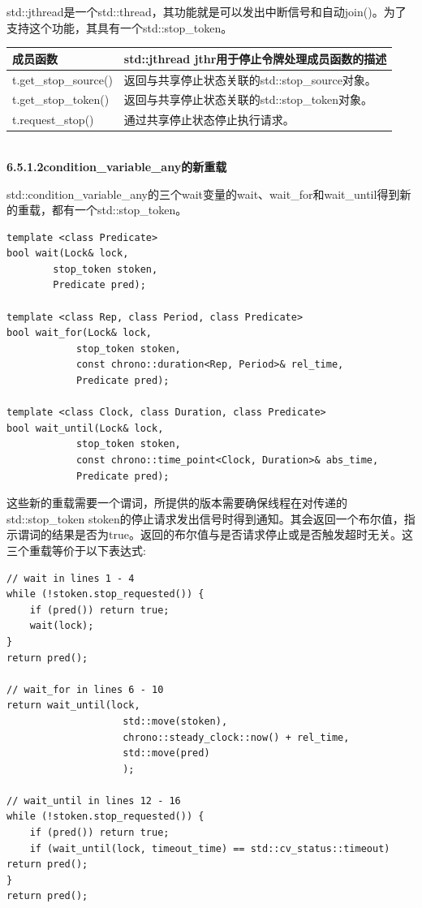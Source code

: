 std::jthread是一个std::thread，其功能就是可以发出中断信号和自动join()。为了支持这个功能，其具有一个std::stop\_token。

\begin{table}[H]
\centering
\begin{tabular}{ll}
\textbf{成员函数}   & \textbf{std::jthread jthr用于停止令牌处理成员函数的描述}                                        \\ \hline
t.get\_stop\_source() & 返回与共享停止状态关联的std::stop\_source对象。 \\
t.get\_stop\_token()  & 返回与共享停止状态关联的std::stop\_token对象。  \\
t.request\_stop() & 通过共享停止状态停止执行请求。
\end{tabular}
\end{table}

\hspace*{\fill} \\ %
\noindent
\textbf{6.5.1.2\hspace{0.2cm}condition\_variable\_any的新重载}

std::condition\_variable\_any的三个wait变量的wait、wait\_for和wait\_until得到新的重载，都有一个std::stop\_token。

\begin{lstlisting}[style=styleCXX]
template <class Predicate>
bool wait(Lock& lock,
		stop_token stoken,
		Predicate pred);

template <class Rep, class Period, class Predicate>
bool wait_for(Lock& lock,
			stop_token stoken,
			const chrono::duration<Rep, Period>& rel_time,
			Predicate pred);

template <class Clock, class Duration, class Predicate>
bool wait_until(Lock& lock,
			stop_token stoken,
			const chrono::time_point<Clock, Duration>& abs_time,
			Predicate pred);
\end{lstlisting}

这些新的重载需要一个谓词，所提供的版本需要确保线程在对传递的std::stop\_token stoken的停止请求发出信号时得到通知。其会返回一个布尔值，指示谓词的结果是否为true。返回的布尔值与是否请求停止或是否触发超时无关。这三个重载等价于以下表达式:

\begin{lstlisting}[style=styleCXX]
// wait in lines 1 - 4
while (!stoken.stop_requested()) {
	if (pred()) return true;
	wait(lock);
}
return pred();

// wait_for in lines 6 - 10
return wait_until(lock,
					std::move(stoken),
					chrono::steady_clock::now() + rel_time,
					std::move(pred)
					);

// wait_until in lines 12 - 16
while (!stoken.stop_requested()) {
	if (pred()) return true;
	if (wait_until(lock, timeout_time) == std::cv_status::timeout) return pred();
}
return pred();
\end{lstlisting}

